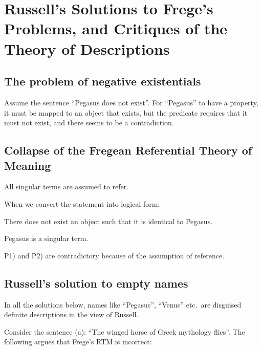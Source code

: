 \chapter{Russell's Solutions to Frege's Problems, and Critiques of the Theory of Descriptions}

\section{The problem of negative existentials}

Assume the sentence ``Pegasus does not exist''. For ``Pegasus'' to have a property, it must be mapped to an object that exists, but the predicate requires that it must not exist, and there seems to be a contradiction.

\section{Collapse of the Fregean Referential Theory of Meaning}

\begin{definition}
All singular terms are assumed to refer.
\end{definition}

When we convert the statement into logical form:
\begin{premises}
  \item[P1)] There does not exist an object such that it is identical to Pegasus.
  \item[P2)] Pegasus is a singular term.
\end{premises}
P1) and P2) are contradictory because of the assumption of reference.

\section{Russell's solution to empty names}

\begin{note}
In all the solutions below, names like ``Pegasus'', ``Venus'' etc.\ are disguised definite descriptions in the view of Russell.
\end{note}

Consider the sentence (a): ``The winged horse of Greek mythology flies''. The following argues that Frege's RTM is incorrect:

